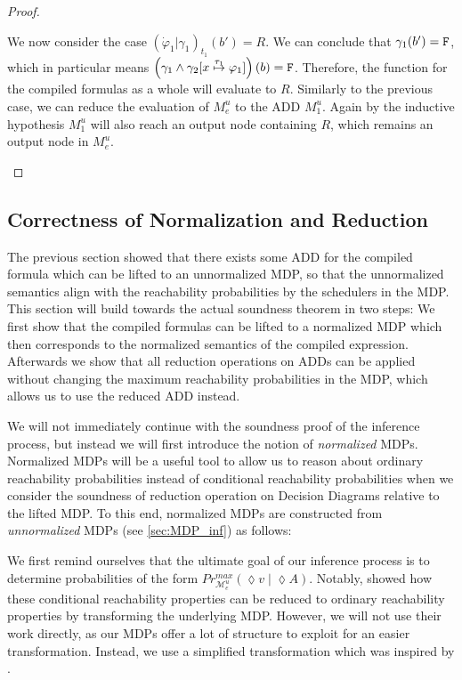 \begin{proof}
\begin{itemize}
		We now consider the case $(\dot{\varphi}_1 | \gamma_1)_{t_1} (b') = R$.
		We can conclude that $\gamma_1 (b') = \texttt{F}$, which in particular means $\left(\gamma_1 \land \gamma_2[x\overset{\tau_1}{\mapsto} \varphi_1]\right)(b) = \texttt{F}$.
		Therefore, the function for the compiled formulas as a whole will evaluate to $R$.
		Similarly to the previous case, we can reduce the evaluation of  $M^u_e$ to the ADD $M^u_1$.
		Again by the inductive hypothesis $M^u_1$ will also reach an output node containing $R$, which remains an output node in $M^u_e$.
		
		
		
	\end{itemize}
\end{proof}



\subsection{Correctness of Normalization and Reduction}

The previous section showed that there exists some ADD for the compiled formula which can be lifted to an unnormalized MDP, so that the unnormalized semantics align with the reachability probabilities by the schedulers in the MDP.
This section will build towards the actual soundness theorem in two steps:
We first show that the compiled formulas can be lifted to a normalized MDP which then corresponds to the normalized semantics of the compiled expression.
Afterwards we show that all reduction operations on ADDs can be applied without changing the maximum reachability probabilities in the MDP, which allows us to use the reduced ADD instead.

	We will not immediately continue with the soundness proof of the \NDICE inference process, but instead we will first introduce the notion of \textit{normalized} MDPs.
	Normalized MDPs will be a useful tool to allow us to reason about ordinary reachability probabilities instead of conditional reachability probabilities when we consider the soundness of reduction operation on Decision Diagrams relative to the lifted MDP.
	To this end, normalized MDPs are constructed from \textit{unnormalized} MDPs (see \ref{sec:MDP_inf}) as follows:
	
	We first remind ourselves that the ultimate goal of our inference process is to determine probabilities of the form $Pr^{max}_{\mathcal{M}^u_e} (\lozenge v \;|\; \lozenge A)$.
	Notably, \citet{baier2014computing} showed how these conditional reachability properties can be reduced to ordinary reachability properties by transforming the underlying MDP.
	However, we will not use their work directly, as our MDPs offer a lot of structure to exploit for an easier transformation.
	Instead, we use a simplified transformation which was inspired by \citet{junges2021runtime}.
	

